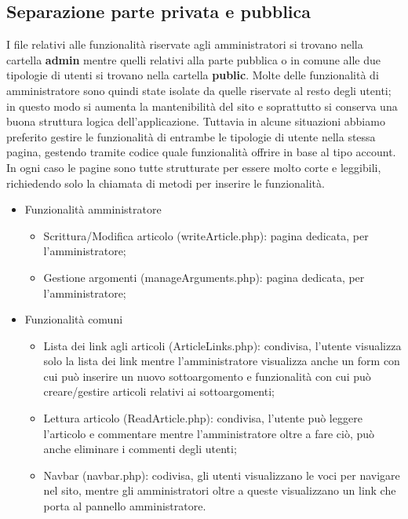 \documentclass[12pt]{article}
\begin{document}
	\subsection{Separazione parte privata e pubblica}
	I file relativi alle funzionalità riservate agli amministratori si trovano nella cartella \textbf{admin} mentre quelli relativi alla parte pubblica o in comune alle due tipologie di utenti si trovano nella cartella \textbf{public}. Molte delle funzionalità di amministratore sono quindi state isolate da quelle riservate al resto degli utenti; in questo modo si aumenta la mantenibilità del sito e soprattutto si conserva una buona struttura logica dell'applicazione. Tuttavia in alcune situazioni abbiamo preferito gestire le funzionalità di entrambe le tipologie di utente nella stessa pagina, gestendo tramite codice quale funzionalità offrire in base al tipo account. In ogni caso le pagine sono tutte strutturate per essere molto corte e leggibili, richiedendo solo la chiamata di metodi per inserire le funzionalità.
	\begin{itemize}
		\item Funzionalità amministratore
			\begin{itemize}
				\item Scrittura/Modifica articolo (writeArticle.php): pagina dedicata, per l'amministratore;
				\item Gestione argomenti (manageArguments.php): pagina dedicata, per l'amministratore;
			\end{itemize}
		\item Funzionalità comuni
			\begin{itemize}
				\item Lista dei link agli articoli (ArticleLinks.php): condivisa, l'utente visualizza solo la lista dei link mentre l'amministratore visualizza anche un form con cui può inserire un nuovo sottoargomento e funzionalità con cui può creare/gestire articoli relativi ai sottoargomenti;
				\item Lettura articolo (ReadArticle.php): condivisa, l'utente può leggere l'articolo e commentare mentre l'amministratore oltre a fare ciò, può anche eliminare i commenti degli utenti;
				\item Navbar (navbar.php): codivisa, gli utenti visualizzano le voci per navigare nel sito, mentre gli amministratori oltre a queste visualizzano un link che porta al pannello amministratore.
			\end{itemize}
	\end{itemize}
\end{document}
